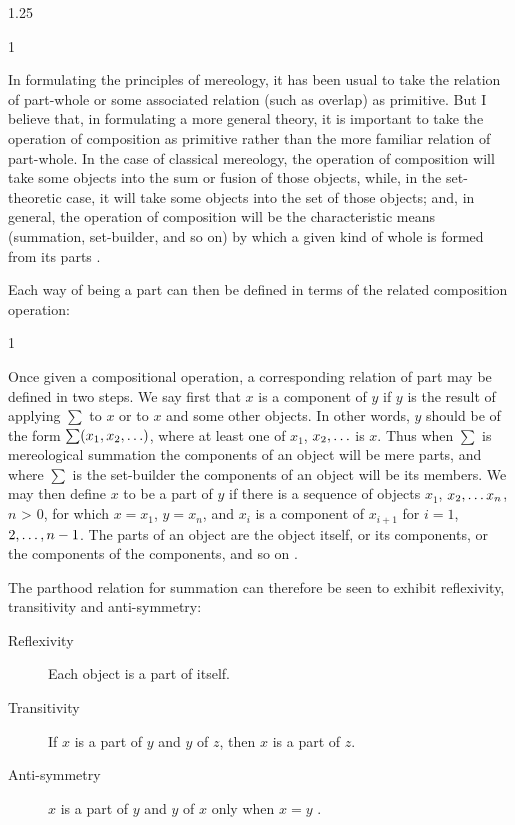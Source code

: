 \documentclass[11pt]{article}
\newenvironment{squote}{%
\begin{spacing}{1}
       	\begin{list}{}{%
\setlength{\labelwidth}{0pt}%
\rightmargin\leftmargin%
}
\item\relax
}{%
\end{list}%
\end{spacing}
}
\begin{document}
\begin{spacing}{1.25}
\begin{squote}
In formulating the principles of mereology, it has been usual to take
the relation of part-whole or some associated relation (such as
overlap) as primitive.  But I believe that, in formulating a more
general theory, it is important to take the operation of composition
as primitive rather than the more familiar relation of part-whole.  In
the case of classical mereology, the operation of composition will
take some objects into the sum or fusion of those objects, while, in
the set-theoretic case, it will take some objects into the set of
those objects; and, in general, the operation of composition will be
the characteristic means (summation, set-builder, and so on) by which
a given kind of whole is formed from its parts \citep[565]{fine2010}.
\end{squote}

Each way of being a part can then be defined in terms of the related
composition operation:

\begin{squote}
Once given a compositional operation, a corresponding relation of part
may be defined in two steps.  We say first that $x$ is a component of
$y$ if $y$ is the result of applying $\sum$ to $x$ or to $x$ and some
other objects.  In other words, $y$ should be of the form $\sum
(x_{1}, x_{2}, \mathellipsis )$, where at least one of $x_1$, $x_2,
\mathellipsis$ is $x$.  Thus when $\sum$ is mereological summation the
components of an object will be mere parts, and where $\sum$ is the
set-builder the components of an object will be its members.  We may
then define $x$ to be a part of $y$ if there is a sequence of objects
$x_1$, $x_2, \mathellipsis x_n$, $n$ \textgreater{} $0$, for which $x
= x_1$, $y = x_n$, and $x_i$ is a component of $x_{i+1}$ for $i = 1$,
$2, \mathellipsis, n-1$. The parts of an object are the object itself,
or its components, or the components of the components, and so on
\citep[567--568]{fine2010}.
\end{squote}

The parthood relation for summation can therefore be seen to exhibit
reflexivity, transitivity and anti-symmetry:

\begin{description}
\item[Reflexivity] Each object is a part of itself.
\item[Transitivity] If $x$ is a part of $y$ and $y$ of $z$, then $x$
  is a part of $z$.
\item[Anti-symmetry] $x$ is a part of $y$ and $y$ of $x$ only when $x
  = y$ \citep[568]{fine2010}.
\end{description}


\end{spacing}
\end{document}

